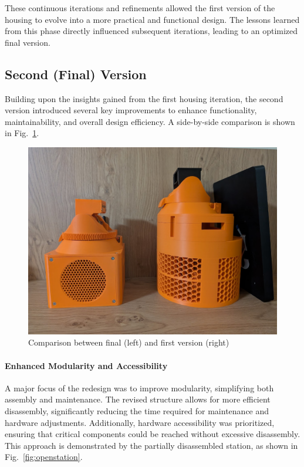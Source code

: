 These continuous iterations and refinements allowed the first version of the housing to evolve into a more practical and functional design. The lessons learned from this phase directly influenced subsequent iterations, leading to an optimized final version.  
  
\subsection{Second (Final) Version}\label{subsec:housing_second_version}
Building upon the insights gained from the first housing iteration, the second version introduced several key improvements to enhance functionality, maintainability, and overall design efficiency. A side-by-side comparison is shown in Fig.~\ref{fig:oldandnewstationcomparison}.

\begin{figure}[H]
	\centering
	\includegraphics[width=1.0\linewidth]{figures/old_and_new_station_comparison}
	\caption{Comparison between final (left) and first version (right)}
	\label{fig:oldandnewstationcomparison}
\end{figure}

\paragraph{Enhanced Modularity and Accessibility}  
A major focus of the redesign was to improve modularity, simplifying both assembly and maintenance. The revised structure allows for more efficient disassembly, significantly reducing the time required for maintenance and hardware adjustments. Additionally, hardware accessibility was prioritized, ensuring that critical components could be reached without excessive disassembly. This approach is demonstrated by the partially disassembled station, as shown in Fig.~\ref{fig:openstation}.

